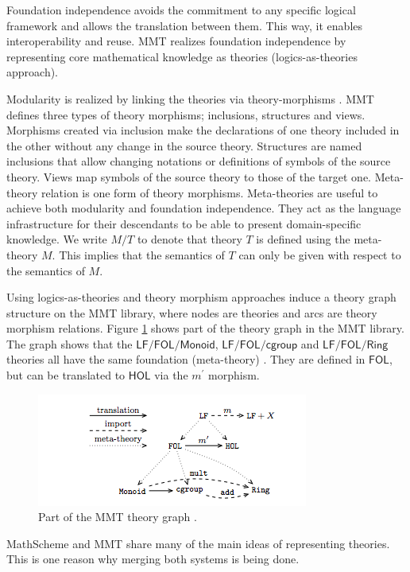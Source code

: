 Foundation independence avoids the commitment to any specific logical framework and allows the translation between them. This way, it enables interoperability and reuse. MMT realizes foundation independence by representing core mathematical knowledge as theories (logics-as-theories approach). 

Modularity is realized by linking the theories via theory-morphisms \cite{rabe2008exchange}. 
MMT defines three types of theory morphisms; inclusions, structures and views\cite{mathhubTut2017}. Morphisms created via inclusion make the declarations of one theory included in the other without any change in the source theory. Structures are named inclusions that allow changing notations or definitions of symbols of the source theory. Views map symbols of the source theory to those of the target one.
Meta-theory relation is one form of theory morphisms. Meta-theories are useful to achieve both 
modularity and foundation independence. They act as the language infrastructure for their 
descendants to be able to present domain-specific knowledge. We write $M/T$ to denote that theory 
$T$ is defined using the meta-theory $M$. This implies that the semantics of $T$ can only be given 
with respect to the semantics of $M$.

Using logics-as-theories and theory morphism approaches induce a theory graph structure on the MMT library, where nodes are theories and arcs are theory morphism relations. Figure \ref{MMT_Library_LF} shows part of the theory graph in the MMT library. The graph shows that the $\mathsf{LF/FOL/Monoid}$, $\mathsf{LF/FOL/cgroup}$ and $\mathsf{LF/FOL/Ring}$ theories all have the same foundation (meta-theory) . They are defined in $\mathsf{FOL}$, but can be translated to $\mathsf{HOL}$ via the $m^\prime$ morphism. 
\begin{figure}
	\centering
	\includegraphics[scale = 1.0]{figures/MMT_Library_LF.png}
	\caption{Part of the MMT theory graph \cite{kohlhase2016qed}.}
	\label{MMT_Library_LF}
\end{figure} 

MathScheme and MMT share many of the main ideas of representing theories. This is one reason why merging both systems is being done. 